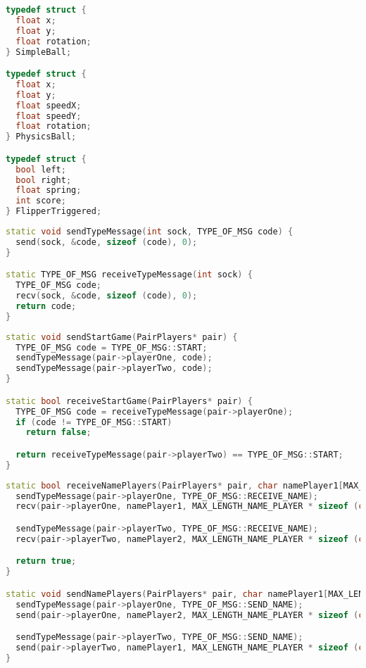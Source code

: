 \begin{lstlisting}[language=C++, caption={Структуры данных передаваемых пакетов},label=DescriptiveLabel]
typedef struct {
  float x;
  float y;
  float rotation;
} SimpleBall;

typedef struct {
  float x;
  float y;
  float speedX;
  float speedY;
  float rotation;
} PhysicsBall;

typedef struct {
  bool left;
  bool right;
  float spring;
  int score;
} FlipperTriggered;

\end{lstlisting}

\begin{lstlisting}[language=C++, caption={Отправка/прием типа сообщения},label=DescriptiveLabel]
static void sendTypeMessage(int sock, TYPE_OF_MSG code) {
  send(sock, &code, sizeof (code), 0);
}

static TYPE_OF_MSG receiveTypeMessage(int sock) {
  TYPE_OF_MSG code;
  recv(sock, &code, sizeof (code), 0);
  return code;
}
\end{lstlisting}

\begin{lstlisting}[language=C++, caption={Отправка/прием сообщения о старте игры},label=DescriptiveLabel]
static void sendStartGame(PairPlayers* pair) {
  TYPE_OF_MSG code = TYPE_OF_MSG::START;
  sendTypeMessage(pair->playerOne, code);
  sendTypeMessage(pair->playerTwo, code);
}

static bool receiveStartGame(PairPlayers* pair) {
  TYPE_OF_MSG code = receiveTypeMessage(pair->playerOne);
  if (code != TYPE_OF_MSG::START)
    return false;

  return receiveTypeMessage(pair->playerTwo) == TYPE_OF_MSG::START;
}

\end{lstlisting}

\begin{lstlisting}[language=C++, caption={Отправка/прием сообщения с именем},label=DescriptiveLabel]
static bool receiveNamePlayers(PairPlayers* pair, char namePlayer1[MAX_LENGTH_NAME_PLAYER], char namePlayer2[MAX_LENGTH_NAME_PLAYER]) {
  sendTypeMessage(pair->playerOne, TYPE_OF_MSG::RECEIVE_NAME);
  recv(pair->playerOne, namePlayer1, MAX_LENGTH_NAME_PLAYER * sizeof (char), 0);

  sendTypeMessage(pair->playerTwo, TYPE_OF_MSG::RECEIVE_NAME);
  recv(pair->playerTwo, namePlayer2, MAX_LENGTH_NAME_PLAYER * sizeof (char), 0);

  return true;
}

static void sendNamePlayers(PairPlayers* pair, char namePlayer1[MAX_LENGTH_NAME_PLAYER], char namePlayer2[MAX_LENGTH_NAME_PLAYER]) {
  sendTypeMessage(pair->playerOne, TYPE_OF_MSG::SEND_NAME);
  send(pair->playerOne, namePlayer2, MAX_LENGTH_NAME_PLAYER * sizeof (char), 0);

  sendTypeMessage(pair->playerTwo, TYPE_OF_MSG::SEND_NAME);
  send(pair->playerTwo, namePlayer1, MAX_LENGTH_NAME_PLAYER * sizeof (char), 0);
}
\end{lstlisting}

